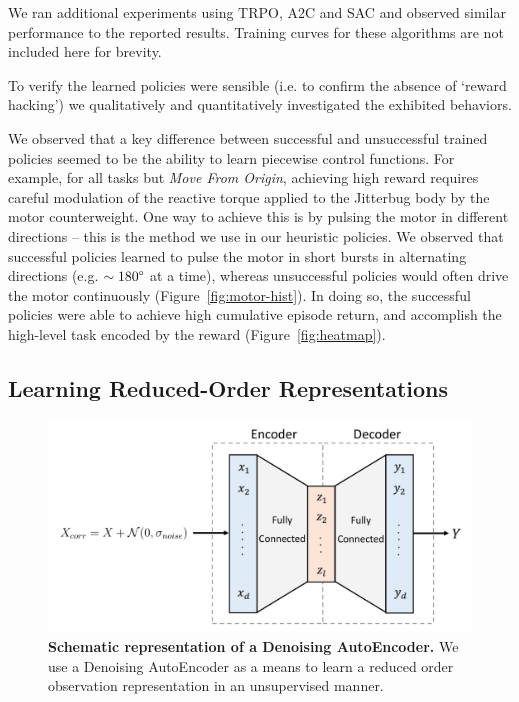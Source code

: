 \documentclass[letterpaper, 10 pt, conference]{ieeeconf}
\begin{document}
We ran additional experiments using TRPO, A2C and SAC and observed similar performance to the reported results.
Training curves for these algorithms are not included here for brevity.

To verify the learned policies were sensible (i.e. to confirm the absence of `reward hacking') we qualitatively and quantitatively investigated the exhibited behaviors.

We observed that a key difference between successful and unsuccessful trained policies seemed to be the ability to learn piecewise control functions.
For example, for all tasks but \emph{Move From Origin}, achieving high reward requires careful modulation of the reactive torque applied to the Jitterbug body by the motor counterweight.
One way to achieve this is by pulsing the motor in different directions -- this is the method we use in our heuristic policies.
We observed that successful policies learned to pulse the motor in short bursts in alternating directions (e.g. $\sim180\degree$ at a time), whereas unsuccessful policies would often drive the motor continuously (Figure~\ref{fig:motor-hist}).
In doing so, the successful policies were able to achieve high cumulative episode return, and accomplish the high-level task encoded by the reward (Figure~\ref{fig:heatmap}).

\subsection{Learning Reduced-Order Representations}

\begin{figure}[t]
    \centering
    \includegraphics[width=\linewidth]{fig-autoencoder}
    \caption{
        \textbf{Schematic representation of a Denoising AutoEncoder.}
        We use a Denoising AutoEncoder as a means to learn a reduced order observation representation in an unsupervised manner.
    }
    \label{fig:autoencoder}
\end{figure}
\end{document}
